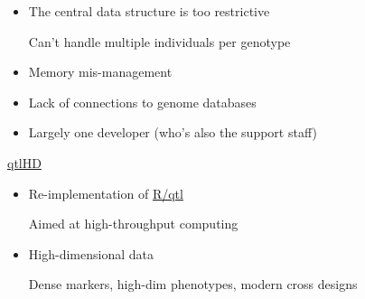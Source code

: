 \documentclass[12pt]{article}
\newcommand{\headsize}{\fontsize{35}{35} \selectfont}
\newcommand{\smallsize}{\fontsize{25}{30} \selectfont}
\newcommand{\smallersize}{\fontsize{20}{25} \selectfont}
\begin{document}
{\begin{minipage}{10in}
\begin{itemize}
{\smallersize \color{myblue}
\begin{itemize}
\item ``Scantwo'' is 4\% of R code and 20\%
  of C code, with a 1354-line R function

\item \href{http://kbroman.wordpress.com/2011/08/17/the-stupidest-r-code-ever/}{The stupidest R code ever}:
\begin{verbatim}
  for(i in 1:n) {
    temp[i] <- all(data[2,1:i]=="")
    if(!temp[i]) break
  }
\end{verbatim}
\end{itemize}
}

\item The central data structure is too restrictive

{\smallersize \color{myblue} Can't handle multiple individuals per genotype}

\item Memory mis-management

\item Lack of connections to genome databases

\item Largely one developer (who's also the support staff)

\end{itemize}
\end{minipage}


\newpage


\headsize \color{myyellow}
\hfill \begin{minipage}{5.75in}
\centering
\href{http://github.com/qtlHD/qtlHD}{qtlHD}
\end{minipage}

\vspace{20mm}

\color{mywhite}
\smallsize

\hfill \begin{minipage}{10in}
\begin{itemize}
\itemsep16pt
\item Re-implementation of \href{http://www.rqtl.org}{R/qtl}

{\smallersize \color{myblue} Aimed at high-throughput computing}

\item High-dimensional data

{\smallersize \color{myblue} Dense markers, high-dim phenotypes,
  modern cross designs}


\end{itemize}
\end{minipage}}
\end{document}
